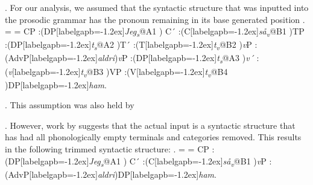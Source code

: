 \documentclass[12pt, letterpaper]{article}
\begin{document}
\ex. For our analysis, we assumed that the syntactic structure that was inputted into the prosodic grammar has the pronoun remaining in its base generated position
\a. \label{ex:tree} 
\jtree[xunit=2.6em,yunit=1em] 
\def\\{[labelgapb=-1.2ex]}%
\everymath={\rm}%
\! = {CP}
:({DP}\\{\textit{Jeg\textsubscript{s}}}@A1 ) {C´}
:({C}\\{\textit{så\textsubscript{v}}}@B1 ){TP}
:({DP}\\{\textit{t\textsubscript{s}}}@A2 ){T´}
:({T}\\{\textit{t\textsubscript{v}}}@B2 ){\textit{v}P}
:({AdvP}\\{\textit{aldri}}){\textit{v}P}
:({DP}\\{\textit{t\textsubscript{s}}}@A3 ){\textit{v´}}
:({\textit{v}}\\{\textit{t\textsubscript{v}}}@B3 ){VP}
:({V}\\{\textit{t\textsubscript{v}}}@B4 ){DP}\\{\textit{ham}}.
\endjtree
\vspace{1em}

\ex. This assumption was also held by \cite{erteschik-shirVariationMainlandScandinavian2019} 

\ex. However, work by \citet{bennettLightestRightApparently2016} suggests that the actual input is a syntactic structure that has had all phonologically empty terminals and categories removed. This results in the following trimmed syntactic structure:
\a. \jtree[xunit=2.6em,yunit=1em] 
\def\\{[labelgapb=-1.2ex]}%
\everymath={\rm}%
\! = {CP}
:({DP}\\{\textit{Jeg\textsubscript{s}}}@A1 ) {C´}
:({C}\\{\textit{så\textsubscript{v}}}@B1 ){\textit{v}P}
:({AdvP}\\{\textit{aldri}}){DP}\\{\textit{ham}}.
\endjtree
\end{document}
